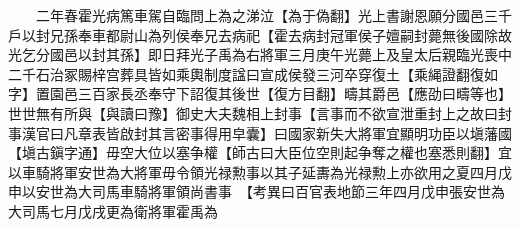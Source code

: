　　二年春霍光病篤車駕自臨問上為之涕泣【為于偽翻】光上書謝恩願分國邑三千戶以封兄孫奉車都尉山為列侯奉兄去病祀【霍去病封冠軍侯子嬗嗣封薨無後國除故光乞分國邑以封其孫】即日拜光子禹為右將軍三月庚午光薨上及皇太后親臨光喪中二千石治冢賜梓宫葬具皆如乘輿制度諡曰宣成侯發三河卒穿復土【乘䋲證翻復如字】置園邑三百家長丞奉守下詔復其後世【復方目翻】疇其爵邑【應劭曰疇等也】世世無有所與【與讀曰豫】御史大夫魏相上封事【言事而不欲宣泄重封上之故曰封事漢官曰凡章表皆啟封其言密事得用皁囊】曰國家新失大將軍宜顯明功臣以塡藩國【塡古鎭字通】毋空大位以塞争權【師古曰大臣位空則起争奪之權也塞悉則翻】宜以車騎將軍安世為大將軍毋令領光禄勲事以其子延夀為光禄勲上亦欲用之夏四月戊申以安世為大司馬車騎將軍領尚書事　【考異曰百官表地節三年四月戊申張安世為大司馬七月戊戌更為衛將軍霍禹為